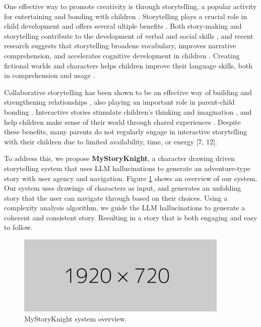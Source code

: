 \documentclass[submit,techrep,english]{ipsj}
\begin{document}
One effective way to promote creativity is through storytelling, a popular activity for entertaining and bonding with children \cite{7:SunLLL17}. Storytelling plays a crucial role in child development \cite{9:RyokaiC99} and offers several ultiple benefits \cite{7:SunLLL17}. Both story-making and storytelling contribute to the development of verbal and social skills \cite{1:ElgarfP22}, and recent research suggests that storytelling broadens vocabulary, improves narrative comprehension, and accelerates cognitive development in children \cite{7:SunLLL17}. Creating fictional worlds and characters helps children improve their language skills, both in comprehension and usage \cite{13:abs-2011-04242}.

Collaborative storytelling has been shown to be an effective way of building and strengthening relationships \cite{8:ShakeriND21}, also playing an important role in parent-child bonding \cite{12:ZhangXWYRWYWL22}. Interactive stories stimulate children's thinking and imagination \cite{11:LimaGV20}, and help children make sense of their world through shared experiences \cite{9:RyokaiC99}. Despite these benefits, many parents do not regularly engage in interactive storytelling with their children due to limited availability, time, or energy [7, 12].

To address this, we propose \textbf{MyStoryKnight}, a character drawing driven storytelling system that uses LLM hallucinations to generate an adventure-type story with user agency and navigation. Figure \ref{fig:system-overview} shows an overview of our system. Our system uses drawings of characters as input, and generates an unfolding story that the user can navigate through based on their choices. Using a complexity analysis algorithm, we guide the LLM hallucinations to generate a coherent and consistent story. Resulting in a story that is both engaging and easy to follow.

\begin{figure}[t]
    \centering
    \includegraphics[width=0.9\textwidth]{figures/1920x720px.png}
    \caption{MyStoryKnight system overview.}
    \label{fig:system-overview}
\end{figure}
\end{document}
